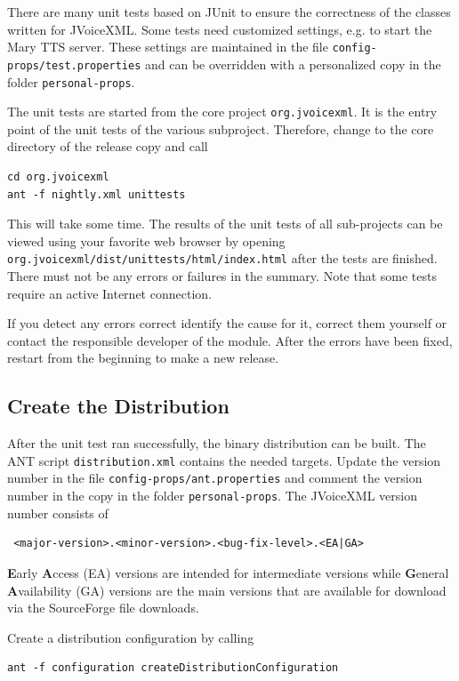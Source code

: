 \documentclass[11pt,a4paper]{article}
\begin{document}
There are many unit tests based on JUnit to ensure the correctness of the
classes written for JVoiceXML. Some tests need customized settings, e.g. to
start the Mary TTS server. These settings are maintained in the file
\texttt{config-props/test.properties} and can be overridden with a
personalized copy in the folder \texttt{personal-props}.

The unit tests are started from the core project
\texttt{org.jvoicexml}. It is the entry point of the unit tests of the various subproject. Therefore, change to the core directory of the release copy and call
\begin{lstlisting}
cd org.jvoicexml
ant -f nightly.xml unittests
\end{lstlisting}
This will take some time. The results of the unit tests of all sub-projects can
be viewed using your favorite web browser by opening
\texttt{org.jvoicexml/dist/unittests/html/index.html} after the tests are
finished. There must not be any errors or failures in the summary. Note that
some tests require an active Internet connection. 

If you detect any errors correct identify the cause for it, correct them
yourself or contact the responsible developer of the module. After the errors
have been fixed, restart from the beginning to make a new release.

\subsection{Create the Distribution}

After the unit test ran successfully, the binary distribution can be built. The
ANT script \texttt{distribution.xml} contains the needed targets.
Update the version number in the file \texttt{config-props/ant.properties}
and comment the version number in the copy in the folder
\texttt{personal-props}. The JVoiceXML version number consists of
\begin{lstlisting}
 <major-version>.<minor-version>.<bug-fix-level>.<EA|GA>
\end{lstlisting}
\textbf{E}arly \textbf{A}ccess (EA) versions are intended for intermediate
versions while \textbf{G}eneral \textbf{A}vailability (GA) versions are the
main versions that are available for download via the SourceForge file
downloads.

Create a distribution configuration by calling
\begin{lstlisting}
ant -f configuration createDistributionConfiguration
\end{lstlisting}
\end{document}
